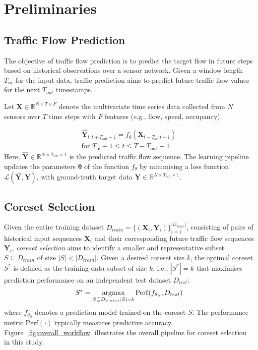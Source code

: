 \section{Preliminaries}

\subsection{Traffic Flow Prediction}

The objective of traffic flow prediction is to predict the target flow in future steps based on historical observations over a sensor network. Given a window length $T_{in}$ for the input data, traffic prediction aims to predict future traffic flow values for the next $T_{out}$ timestamps. 

Let \(\mathbf X\in\mathbb R^{N\times T\times F}\) denote the multivariate time series data collected from \(N\) sensors over \(T\) time steps with \(F\) features (e.g., flow, speed, occupancy).

\begin{equation}\label{eq:forecast_centered}
\begin{gathered}
  \hat{\mathbf{Y}}_{t : t+T_{\text{out}}-1}
      = f_{\theta}\!\left(\mathbf{X}_{t-T_{\text{in}} : t-1}\right)
      \\[6pt]
  \text{for } T_{\text{in}} + 1 \le t \le T - T_{\text{out}} + 1 .
\end{gathered}
\end{equation}
%
Here, \(\hat{\mathbf{Y}} \in \mathbb{R}^{N \times T_{\text{out}} \times 1}\) is the predicted traffic flow sequence. The learning pipeline updates the parameters \(\boldsymbol{\theta}\) of the function \(f_{\theta}\) by minimising a loss function \(\mathcal{L}(\hat{\mathbf{Y}}, \mathbf{Y})\), with ground-truth target data \(\mathbf{Y} \in \mathbb{R}^{N \times T_{\text{out}} \times 1}\). 


\subsection{Coreset Selection}

Given the entire training dataset $D_{train} = \{(\mathbf{X}_i, \mathbf{Y}_i)\}_{i=1}^{|D_{train}|}$, consisting of pairs of historical input sequences $\mathbf{X}_i$ and their corresponding future traffic flow sequences $\mathbf{Y}_i$, \textit{coreset selection} aims to identify a smaller and representative subset $S \subseteq D_{train}$ of size $|S| < |D_{train}|$. Given a desired coreset size $k$, the optimal coreset $S^*$ is defined as the training data subset of size $k$, i.e., $|S^*|=k$ that maximises prediction performance on an independent test dataset $D_{test}$:
\begin{equation}
S^* = \operatorname*{argmax}_{S \subseteq D_{train},\, |S| = k} \mathrm{Perf}(f_{\theta_S}, D_{test})
\end{equation}
%
where $f_{\theta_S}$ denotes a prediction model trained on the coreset $S$. The performance metric $\mathrm{Perf}(\cdot)$ typically measures predictive accuracy. Figure~\ref{fig:overall_workflow} illustrates the overall pipeline for coreset selection in this study.
